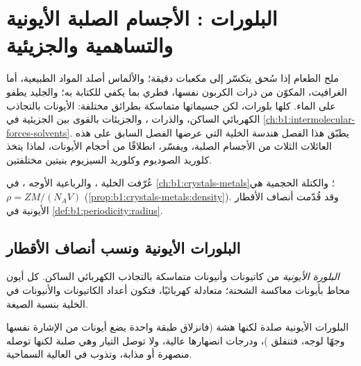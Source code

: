 \chapter{البلورات \texorpdfstring{}{(2)}: الأجسام الصلبة الأيونية والتساهمية والجزيئية}\label{ch:b1:crystals-ionic-covalent}

ملح الطعام إذا سُحق يتكسّر إلى مكعبات دقيقة؛ والألماس أصلد المواد
الطبيعية، أما الغرافيت، المكوّن من ذرات الكربون نفسها، فطري
بما يكفي للكتابة به؛ والجليد يطفو على الماء. كلها بلورات، لكن
جسيماتها متماسكة بطرائق مختلفة: الأيونات بالتجاذب الكهربائي
الساكن، والذرات ، والجزيئات بالقوى
بين الجزيئية في \cref{ch:b1:intermolecular-forces-solvents}. يطبّق هذا الفصل
هندسة الخلية التي عرضها الفصل السابق على هذه العائلات الثلاث
من الأجسام الصلبة، ويفسّر، انطلاقًا من أحجام الأيونات، لماذا يتخذ كلوريد الصوديوم
وكلوريد السيزيوم بنيتين مختلفتين.

\begin{recall}
عُرّفت  الخلية  ،  والرباعية الأوجه  ، في
\cref{ch:b1:crystals-metals}؛ والكتلة الحجمية  هي
$\rho = ZM/(N_A V)$ (\cref{prop:b1:crystals-metals:density}). وقد قُدّمت أنصاف
الأقطار الأيونية في \cref{def:b1:periodicity:radius}.
\end{recall}

\section{البلورات الأيونية ونسب أنصاف الأقطار}

\begin{definition}\label{def:b1:crystals-ionic-covalent:ionic-crystal}
\emph{البلورة الأيونية}  من كاتيونات
وأنيونات متماسكة بالتجاذب الكهربائي الساكن. كل أيون محاط
بأيونات معاكسة الشحنة؛  متعادلة كهربائيًا، فتكون
أعداد الكاتيونات والأنيونات في الخلية بنسبة الصيغة.
\end{definition}

\begin{proposition}\label{prop:b1:crystals-ionic-covalent:ionic-properties}
البلورات الأيونية صلدة لكنها هشة (فانزلاق طبقة واحدة يضع أيونات
من الإشارة نفسها وجهًا لوجه، فتنفلق )، ودرجات انصهارها
عالية، ولا توصل التيار وهي صلبة لكنها توصله منصهرة أو مذابة،
وتذوب في  العالية السماحية.
\end{proposition}
\admitted

